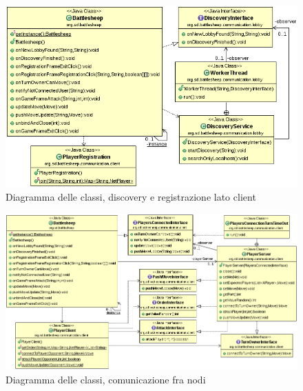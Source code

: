 \begin{figure}[!ht]
    \centering
    \includegraphics[scale=0.60,center]{core/imgs/UML/RegistrationBattlesheepCommunicationUML-noattr.png}
    \caption{Diagramma delle classi, discovery e registrazione lato client}
    \label{fig:classregistration}
\end{figure}

\begin{figure}[!ht]
    \centering
    \includegraphics[scale=0.50,center]{core/imgs/UML/GameBattlesheepCommunicationUML-noattr.png}
    \caption{Diagramma delle classi, comunicazione fra nodi}
    \label{fig:classgame}
\end{figure}


